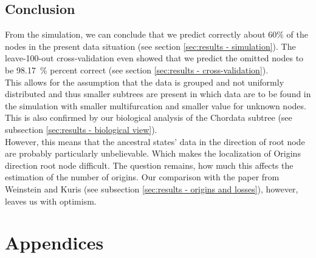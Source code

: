   \section{Conclusion}

    From the simulation, we can conclude that we predict correctly about 60\% of the nodes in the 
      present data situation (see section \ref{sec:results - simulation}).
    The leave-100-out cross-validation even showed that we predict the omitted nodes to be 98.17~\%  
      percent correct (see section \ref{sec:results - cross-validation}). \\
    This allows for the assumption that the data is grouped and not uniformly distributed and thus 
      smaller subtrees are present in which data are to be found in the simulation with smaller 
      multifurcation and smaller value for unknown nodes. This is also confirmed by our biological 
      analysis of the Chordata subtree (see subsection \ref{sec:results - biological view}). \\
    However, this means that the ancestral states' data in the direction of root node are probably 
      particularly unbelievable. Which makes the localization of Origins direction root node 
      difficult. The question remains, how much this affects the estimation of the number of origins. 
      Our comparison with the paper from Weinstein and Kuris \cite{Weinstein2016} (see subsection 
      \ref{sec:results - origins and losses}), however, leaves us with optimism.



\chapter{Appendices}
